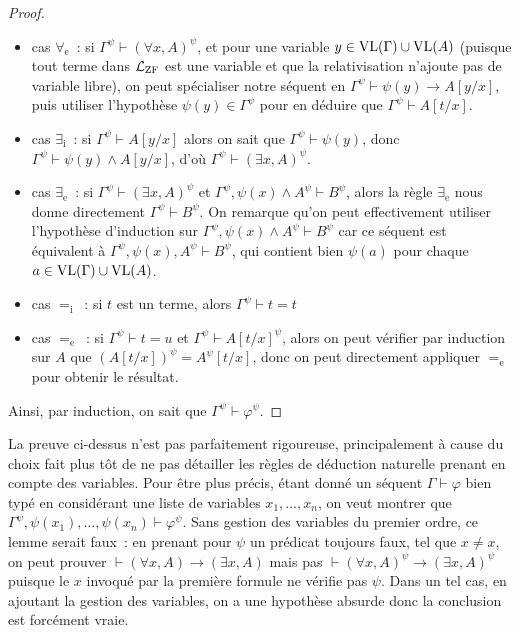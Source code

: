 \begin{proof}
\begin{itemize}
  \item cas $\forall_\mathrm e$~: si $\Gamma^\psi \vdash (\forall x,A)^\psi$, et
    pour une variable $y \in \operatorname{VL}(\Gamma)\cup \operatorname{VL}(A)$ (puisque tout terme dans
    $\mathcal L_{\operatorname{ZF}}$ est une variable et que la relativisation n'ajoute pas
    de variable libre), on peut spécialiser notre séquent en
    $\Gamma^\psi \vdash \psi(y)\to A[y/x]$, puis utiliser l'hypothèse
    $\psi(y)\in\Gamma^\psi$ pour en déduire que $\Gamma^\psi \vdash A[t/x]$.
  \item cas $\exists_\mathrm i$~: si $\Gamma^\psi \vdash A[y/x]$ alors on sait
    que $\Gamma^\psi\vdash \psi(y)$, donc
    $\Gamma^\psi\vdash \psi(y)\land A[y/x]$, d'où
    $\Gamma^\psi \vdash (\exists x, A)^\psi$.
  \item cas $\exists_\mathrm e$~: si $\Gamma^\psi \vdash (\exists x, A)^\psi$ et
    $\Gamma^\psi, \psi(x) \land A^\psi \vdash B^\psi$, alors la règle
    $\exists_\mathrm e$ nous donne directement $\Gamma^\psi \vdash B^\psi$. On
    remarque qu'on peut effectivement utiliser l'hypothèse d'induction sur
    $\Gamma^\psi, \psi(x)\land A^\psi\vdash B^\psi$ car ce séquent est équivalent
    à $\Gamma^\psi, \psi(x), A^\psi \vdash B^\psi$, qui contient bien $\psi(a)$
    pour chaque $a \in \operatorname{VL}(\Gamma)\cup\operatorname{VL}(A)$.
  \item cas $=_\mathrm i$~: si $t$ est un terme, alors $\Gamma^\psi\vdash t = t$
  \item cas $=_\mathrm e$~: si $\Gamma^\psi \vdash t = u$ et
    $\Gamma^\psi \vdash A[t/x]^\psi$, alors on peut vérifier par induction sur
    $A$ que $(A[t/x])^\psi = A^\psi [t/x]$, donc on peut directement appliquer
    $=_\mathrm e$ pour obtenir le résultat.
  \end{itemize}
  Ainsi, par induction, on sait que $\Gamma^\psi \vdash \varphi^\psi$.
\end{proof}

\begin{remark}
  La preuve ci-dessus n'est pas parfaitement rigoureuse, principalement à cause
  du choix fait plus tôt de ne pas détailler les règles de déduction naturelle
  prenant en compte des variables. Pour être plus précis, étant donné un séquent
  $\Gamma\vdash \varphi$ bien typé en considérant une liste de variables
  $x_1,\ldots,x_n$, on veut montrer que
  $\Gamma^\psi, \psi(x_1),\ldots,\psi(x_n) \vdash \varphi^\psi$. Sans gestion des
  variables du premier ordre, ce lemme serait faux~: en prenant pour $\psi$ un
  prédicat toujours faux, tel que $x\neq x$, on peut prouver
  $\vdash (\forall x, A)\to (\exists x, A)$ mais pas
  $\vdash (\forall x,A)^\psi \to (\exists x, A)^\psi$ puisque le $x$ invoqué par
  la première formule ne vérifie pas $\psi$. Dans un tel cas, en ajoutant la
  gestion des variables, on a une hypothèse absurde donc la conclusion est
  forcément vraie.
\end{remark}

